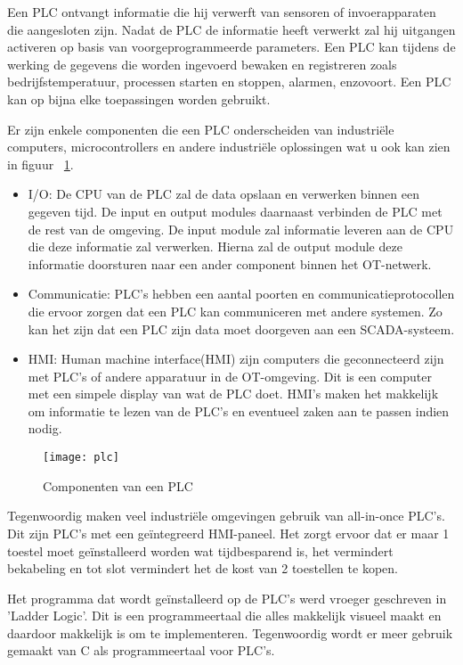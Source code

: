 Een PLC ontvangt informatie die hij verwerft van sensoren of invoerapparaten die aangesloten zijn. Nadat de PLC de informatie heeft verwerkt zal hij uitgangen activeren op basis van voorgeprogrammeerde parameters. Een PLC kan tijdens de werking de gegevens die worden ingevoerd bewaken en registreren zoals bedrijfstemperatuur, processen starten en stoppen, alarmen, enzovoort. Een PLC kan op bijna elke toepassingen worden gebruikt.

Er zijn enkele componenten die een PLC onderscheiden van industriële computers, microcontrollers en andere industriële oplossingen wat u ook kan zien in figuur ~\ref{fig:2.5}.
\begin{itemize}
    \item I/O: De CPU van de PLC zal de data opslaan en verwerken binnen een gegeven tijd. De input en output modules daarnaast verbinden de PLC met de rest van de omgeving. De input module zal informatie leveren aan de CPU die deze informatie zal verwerken. Hierna zal de output module deze informatie doorsturen naar een ander component binnen het OT-netwerk. 
    \item Communicatie: PLC's hebben een aantal poorten en communicatieprotocollen die ervoor zorgen dat een PLC kan communiceren met andere systemen. Zo kan het zijn dat een PLC zijn data moet doorgeven aan een SCADA-systeem.
    \item HMI: Human machine interface(HMI) zijn computers die geconnecteerd zijn met PLC's of andere apparatuur in de OT-omgeving. Dit is een computer met een simpele display van wat de PLC doet. HMI's maken het makkelijk om informatie te lezen van de PLC's en eventueel zaken aan te passen indien nodig.
\end{itemize}
\begin{figure}
    \texttt{[image: plc]}
    \caption{Componenten van een PLC~\autocite{Unitronics} \label{fig:2.5}} 
\end{figure}


Tegenwoordig maken veel industriële omgevingen gebruik van all-in-once PLC's. Dit zijn PLC's met een geïntegreerd HMI-paneel. Het zorgt ervoor dat er maar 1 toestel moet geïnstalleerd worden wat tijdbesparend is, het vermindert bekabeling en tot slot vermindert het de kost van 2 toestellen te kopen.

Het programma dat wordt geïnstalleerd op de PLC's werd vroeger geschreven in 'Ladder Logic'. Dit is een programmeertaal die alles makkelijk visueel maakt en daardoor makkelijk is om te implementeren. Tegenwoordig wordt er meer gebruik gemaakt van C als programmeertaal voor PLC's.

